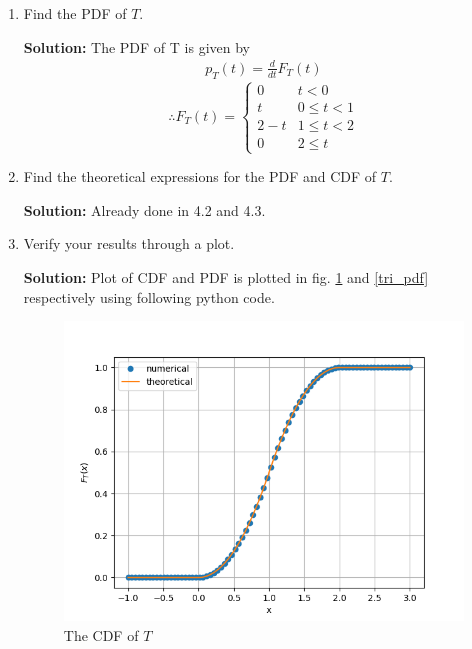 \documentclass[journal,12pt,twocolumn]{IEEEtran}
\renewcommand\thesection{\arabic{section}}
\theoremstyle{remark}
\newcommand{\solution}{\noindent \textbf{Solution: }}
\numberwithin{equation}{section}
\begin{document}
\begin{enumerate}[label=\thesection.\arabic*
,ref=\thesection.\theenumi]
\[
\therefore
F_T(t)=
\begin{cases}
	0&  t<0\\
	\frac{t_2}{2} &  0\leq t<1\\
	\frac{-t^2}{2}+2t-1  &  1\leq t<2\\
	1  & 2\leq t
\end{cases}
\]
\item Find the PDF of $T$.

\solution The PDF of T is given by
\begin{align}
	p_{T}(t) = \frac{d}{dt}F_{T}(t)
\end{align}
\[
\therefore
F_T(t)=
\begin{cases}
	0&  t<0\\
	t &  0\leq t<1\\
	2-t  &  1\leq t<2\\
	0  & 2\leq t
\end{cases}
\]
\item Find the theoretical expressions for the PDF and CDF of $T$.

\solution Already done in 4.2 and 4.3.
\item Verify your results through a plot. 

\solution Plot of CDF and PDF is plotted in fig. \ref{tri_cdf} and \ref{tri_pdf} respectively using following python code.

\begin{figure}
	\centering
		\includegraphics[width=\columnwidth]{./ques_4/tri_cdf.png}
	\caption{The CDF of $T$}
	\label{tri_cdf}
\end{figure}


\end{enumerate}
\end{document}
